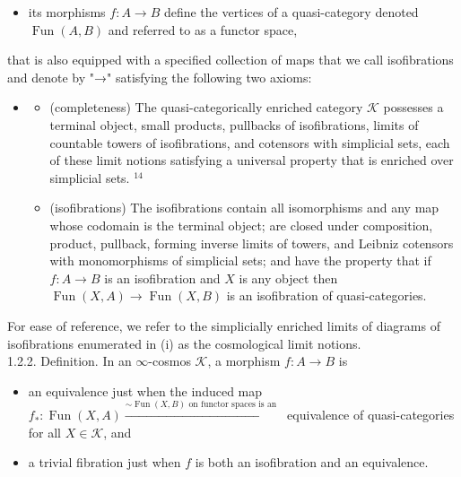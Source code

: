 \documentclass[10pt]{article}
\begin{document}
\begin{itemize}
  \item[-] its morphisms $f: A \rightarrow B$ define the vertices of a quasi-category denoted $\operatorname{Fun}(A, B)$ and referred to as a functor space,
\end{itemize}

that is also equipped with a specified collection of maps that we call isofibrations and denote by "→" satisfying the following two axioms:

\begin{itemize}
  \item[]
  \begin{itemize}
    \item[(i)] (completeness) The quasi-categorically enriched category $\mathcal{K}$ possesses a terminal object, small products, pullbacks of isofibrations, limits of countable towers of isofibrations, and cotensors with simplicial sets, each of these limit notions satisfying a universal property that is enriched over simplicial sets. ${ }^{14}$
    \item[(ii)] (isofibrations) The isofibrations contain all isomorphisms and any map whose codomain is the terminal object; are closed under composition, product, pullback, forming inverse limits of towers, and Leibniz cotensors with monomorphisms of simplicial sets; and have the property that if $f: A \rightarrow B$ is an isofibration and $X$ is any object then $\operatorname{Fun}(X, A) \rightarrow \operatorname{Fun}(X, B)$ is an isofibration of quasi-categories.
  \end{itemize}
\end{itemize}

For ease of reference, we refer to the simplicially enriched limits of diagrams of isofibrations enumerated in (i) as the cosmological limit notions.\\
1.2.2. Definition. In an $\infty$-cosmos $\mathcal{K}$, a morphism $f: A \rightarrow B$ is

\begin{itemize}
  \item[-] an equivalence just when the induced map $f_{*}: \operatorname{Fun}(X, A) \xrightarrow{\sim \operatorname{Fun}(X, B) \text { on functor spaces is an }}$ equivalence of quasi-categories for all $X \in \mathcal{K}$, and
  \item[-] a trivial fibration just when $f$ is both an isofibration and an equivalence.
\end{itemize}
\end{document}
